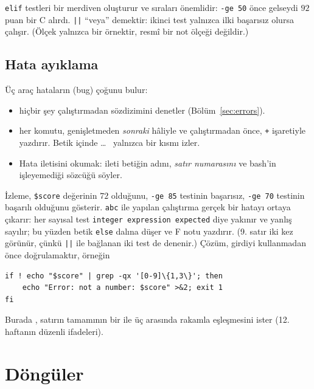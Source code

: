 


\texttt{elif} testleri bir merdiven oluşturur ve sıraları önemlidir: \texttt{-ge 50} önce gelseydi $92$ puan bir C alırdı. \texttt{||} “veya” demektir: ikinci test yalnızca ilki başarısız olursa çalışır. (Ölçek yalnızca bir örnektir, resmî bir not ölçeği değildir.)

\subsection{Hata ayıklama}
\label{sec:debug}

Üç araç hataların (bug) çoğunu bulur:
\begin{itemize}
  \item {} hiçbir şey çalıştırmadan sözdizimini denetler (Bölüm~\ref{sec:errors}).
  \item {} her komutu, genişletmeden \emph{sonraki} hâliyle ve çalıştırmadan önce, \texttt{+} işaretiyle yazdırır. Betik içinde  \ldots\  yalnızca bir kısmı izler.
  \item Hata iletisini okumak: ileti betiğin adını, \emph{satır numarasını} ve bash'in işleyemediği sözcüğü söyler.
\end{itemize}


İzleme, \texttt{\$score} değerinin $72$ olduğunu, \texttt{-ge 85} testinin başarısız, \texttt{-ge 70} testinin başarılı olduğunu gösterir. \texttt{abc} ile yapılan çalıştırma gerçek bir hatayı ortaya çıkarır: her sayısal test \texttt{integer expression expected} diye yakınır ve yanlış sayılır; bu yüzden betik \texttt{else} dalına düşer ve F notu yazdırır. (9. satır iki kez görünür, çünkü \texttt{||} ile bağlanan iki test de denenir.) Çözüm, girdiyi kullanmadan önce doğrulamaktır, örneğin
\begin{lstlisting}[style=sh,numbers=none]
if ! echo "$score" | grep -qx '[0-9]\{1,3\}'; then
    echo "Error: not a number: $score" >&2; exit 1
fi
\end{lstlisting}
Burada , satırın tamamının bir ile üç arasında rakamla eşleşmesini ister (12. haftanın düzenli ifadeleri).

\section{Döngüler}

